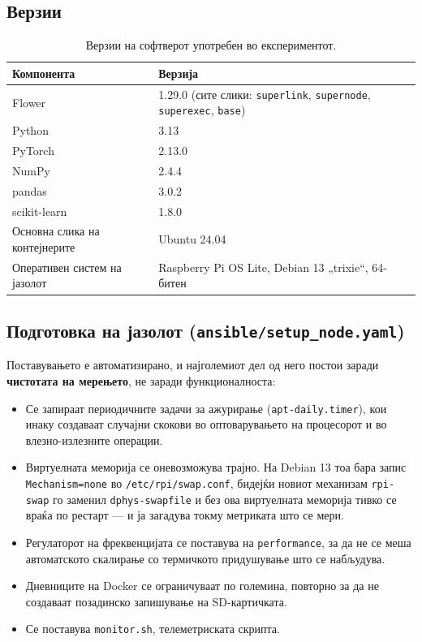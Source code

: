 \subsection{Верзии}

\begin{table}[htbp]
\centering
\caption{Верзии на софтверот употребен во експериментот.}
\label{tab:versions}
\begin{tabular}{ll}
\toprule
Компонента & Верзија \\
\midrule
Flower & 1.29.0 (сите слики: \texttt{superlink}, \texttt{supernode}, \texttt{superexec}, \texttt{base}) \\
Python & 3.13 \\
PyTorch & 2.13.0 \\
NumPy & 2.4.4 \\
pandas & 3.0.2 \\
scikit-learn & 1.8.0 \\
Основна слика на контејнерите & Ubuntu 24.04 \\
Оперативен систем на јазолот & Raspberry Pi OS Lite, Debian 13 „trixie“, 64-битен \\
\bottomrule
\end{tabular}
\end{table}

\subsection{Подготовка на јазолот (\texttt{ansible/setup\_node.yaml})}

Поставувањето е автоматизирано, и најголемиот дел од него постои заради \textbf{чистотата на
мерењето}, не заради функционалноста:

\begin{itemize}
  \item Се запираат периодичните задачи за ажурирање (\texttt{apt-daily.timer}), кои инаку создаваат случајни скокови во оптоварувањето на процесорот и во влезно-излезните операции.
  \item Виртуелната меморија се оневозможува трајно. На Debian 13 тоа бара запис \texttt{Mechanism=none} во \texttt{/etc/rpi/swap.conf}, бидејќи новиот механизам \texttt{rpi-swap} го заменил \texttt{dphys-swapfile} и без ова виртуелната меморија тивко се враќа по рестарт --- и ја загадува токму метриката што се мери.
  \item Регулаторот на фреквенцијата се поставува на \texttt{performance}, за да не се меша автоматското скалирање со термичкото придушување што се набљудува.
  \item Дневниците на Docker се ограничуваат по големина, повторно за да не создаваат позадинско запишување на SD-картичката.
  \item Се поставува \texttt{monitor.sh}, телеметриската скрипта.
\end{itemize}

